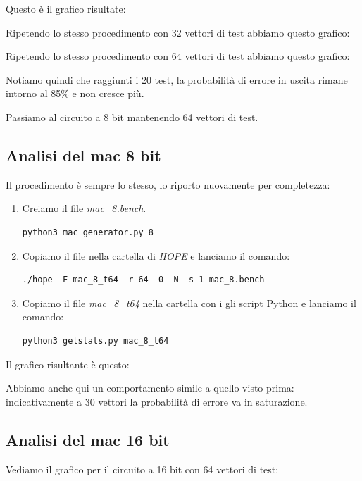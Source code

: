 \documentclass[12pt, letterpaper]{article}
\begin{document}
Questo è il grafico risultate:



Ripetendo lo stesso procedimento con 32 vettori di test abbiamo questo grafico:



Ripetendo lo stesso procedimento con 64 vettori di test abbiamo questo grafico:



Notiamo quindi che raggiunti i 20 test, la probabilità di errore in uscita rimane intorno al 85\% e non cresce più.

Passiamo al circuito a 8 bit mantenendo 64 vettori di test.

\subsection{Analisi del mac 8 bit}

Il procedimento è sempre lo stesso, lo riporto nuovamente per completezza:

\begin{enumerate}
\item Creiamo il file \textit{mac\_8.bench}.
\begin{lstlisting}
python3 mac_generator.py 8
\end{lstlisting}
\item Copiamo il file nella cartella di \textit{HOPE} e lanciamo il comando:
\begin{lstlisting}
./hope -F mac_8_t64 -r 64 -0 -N -s 1 mac_8.bench
\end{lstlisting}
\item Copiamo il file \textit{mac\_8\_t64} nella cartella con i gli script Python e lanciamo il comando:
\begin{lstlisting}
python3 getstats.py mac_8_t64
\end{lstlisting}
\end{enumerate}

Il grafico risultante è questo:



Abbiamo anche qui un comportamento simile a quello visto prima: indicativamente a 30 vettori la probabilità di errore va in saturazione.

\subsection{Analisi del mac 16 bit}
Vediamo il grafico per il circuito a 16 bit con 64 vettori di test:
\end{document}
